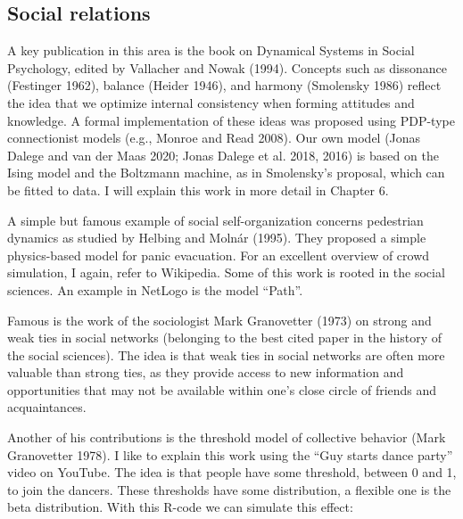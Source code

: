 \documentclass[
  letterpaper,
]{scrbook}
\begin{document}
\hypertarget{social-relations}{%
\subsection{Social relations}\label{social-relations}}

A key publication in this area is the book on Dynamical Systems in
Social Psychology, edited by Vallacher and Nowak (1994). Concepts such
as dissonance (Festinger 1962), balance (Heider 1946), and harmony
(Smolensky 1986) reflect the idea that we optimize internal consistency
when forming attitudes and knowledge. A formal implementation of these
ideas was proposed using PDP-type connectionist models (e.g., Monroe and
Read 2008). Our own model (Jonas Dalege and van der Maas 2020; Jonas
Dalege et al. 2018, 2016) is based on the Ising model and the Boltzmann
machine, as in Smolensky's proposal, which can be fitted to data. I will
explain this work in more detail in Chapter 6.

A simple but famous example of social self-organization concerns
pedestrian dynamics as studied by Helbing and Molnár (1995). They
proposed a simple physics-based model for panic evacuation. For an
excellent overview of crowd simulation, I again, refer to Wikipedia.
Some of this work is rooted in the social sciences. An example in
NetLogo is the model ``Path''.

Famous is the work of the sociologist Mark Granovetter (1973) on strong
and weak ties in social networks (belonging to the best cited paper in
the history of the social sciences). The idea is that weak ties in
social networks are often more valuable than strong ties, as they
provide access to new information and opportunities that may not be
available within one's close circle of friends and acquaintances.

Another of his contributions is the threshold model of collective
behavior (Mark Granovetter 1978). I like to explain this work using the
``Guy starts dance party'' video on YouTube. The idea is that people
have some threshold, between 0 and 1, to join the dancers. These
thresholds have some distribution, a flexible one is the beta
distribution. With this R-code we can simulate this effect:
\end{document}
